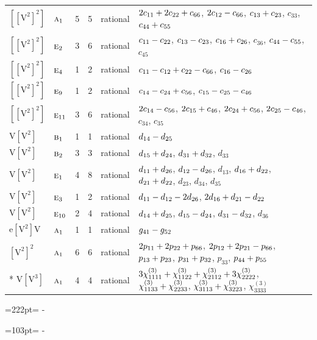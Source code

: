 \documentclass[10pt,a4paper]{article}
\newcommand{\needspace}[1]{\par\penalty-100\begingroup\dimen0=#1\relax\dimen2=\pagegoal
  \advance\dimen2-\pagetotal\ifdim\dimen0>\dimen2\relax\ifdim\dimen2>0pt\vfil\break\fi\fi
  \endgroup}
\numberwithin{equation}{section}
\newcommand{\irr}[1]{\text{\normalfont\scshape #1}}
\newcommand{\jahn}[1]{\mathrm{#1}}
\newlength{\fillwidth}\newlength{\cellwidth}\newlength{\colwidth}
\newcommand{\signbreak}{\penalty100\relax}
\begin{document}
{\begin{longtable}{@{}llrrl>{\RaggedRight\arraybackslash}p{\fillwidth}@{}}
$\jahn{[[V^{2}]^{2}]}$ & $\irr{a}_{1}$ & 5 & 5 & rational & $2c_{11} +\signbreak 2c_{22} +\signbreak c_{66}$, $2c_{12} -\signbreak c_{66}$, $c_{13} +\signbreak c_{23}$, $c_{33}$, $c_{44} +\signbreak c_{55}$\\
$\jahn{[[V^{2}]^{2}]}$ & $\irr{e}_{2}$ & 3 & 6 & rational & $c_{11} -\signbreak c_{22}$, $c_{13} -\signbreak c_{23}$, $c_{16} +\signbreak c_{26}$, $c_{36}$, $c_{44} -\signbreak c_{55}$, $c_{45}$\\
$\jahn{[[V^{2}]^{2}]}$ & $\irr{e}_{4}$ & 1 & 2 & rational & $c_{11} -\signbreak c_{12} +\signbreak c_{22} -\signbreak c_{66}$, $c_{16} -\signbreak c_{26}$\\
$\jahn{[[V^{2}]^{2}]}$ & $\irr{e}_{9}$ & 1 & 2 & rational & $c_{14} -\signbreak c_{24} +\signbreak c_{56}$, $c_{15} -\signbreak c_{25} -\signbreak c_{46}$\\
$\jahn{[[V^{2}]^{2}]}$ & $\irr{e}_{11}$ & 3 & 6 & rational & $2c_{14} -\signbreak c_{56}$, $2c_{15} +\signbreak c_{46}$, $2c_{24} +\signbreak c_{56}$, $2c_{25} -\signbreak c_{46}$, $c_{34}$, $c_{35}$\\
$\jahn{V[V^{2}]}$ & $\irr{b}_{1}$ & 1 & 1 & rational & $d_{14} -\signbreak d_{25}$\\
$\jahn{V[V^{2}]}$ & $\irr{b}_{2}$ & 3 & 3 & rational & $d_{15} +\signbreak d_{24}$, $d_{31} +\signbreak d_{32}$, $d_{33}$\\
$\jahn{V[V^{2}]}$ & $\irr{e}_{1}$ & 4 & 8 & rational & $d_{11} +\signbreak d_{26}$, $d_{12} -\signbreak d_{26}$, $d_{13}$, $d_{16} +\signbreak d_{22}$, $d_{21} +\signbreak d_{22}$, $d_{23}$, $d_{34}$, $d_{35}$\\
$\jahn{V[V^{2}]}$ & $\irr{e}_{3}$ & 1 & 2 & rational & $d_{11} -\signbreak d_{12} -\signbreak 2d_{26}$, $2d_{16} +\signbreak d_{21} -\signbreak d_{22}$\\
$\jahn{V[V^{2}]}$ & $\irr{e}_{10}$ & 2 & 4 & rational & $d_{14} +\signbreak d_{25}$, $d_{15} -\signbreak d_{24}$, $d_{31} -\signbreak d_{32}$, $d_{36}$\\
$\jahn{e[V^{2}]V}$ & $\irr{a}_{1}$ & 1 & 1 & rational & $\mathnormal{g}_{41} -\signbreak \mathnormal{g}_{52}$\\
$\jahn{[V^{2}]^{2}}$ & $\irr{a}_{1}$ & 6 & 6 & rational & $2p_{11} +\signbreak 2p_{22} +\signbreak p_{66}$, $2p_{12} +\signbreak 2p_{21} -\signbreak p_{66}$, $p_{13} +\signbreak p_{23}$, $p_{31} +\signbreak p_{32}$, $p_{33}$, $p_{44} +\signbreak p_{55}$\\*
$\jahn{V[V^{3}]}$ & $\irr{a}_{1}$ & 4 & 4 & rational & $3\chi^{(3)}_{1111} +\signbreak \chi^{(3)}_{1122} +\signbreak \chi^{(3)}_{2112} +\signbreak 3\chi^{(3)}_{2222}$, $\chi^{(3)}_{1133} +\signbreak \chi^{(3)}_{2233}$, $\chi^{(3)}_{3113} +\signbreak \chi^{(3)}_{3223}$, $\chi^{(3)}_{3333}$\\
\bottomrule\end{longtable}}
\needspace{222pt}
\needspace{103pt}
\end{document}
